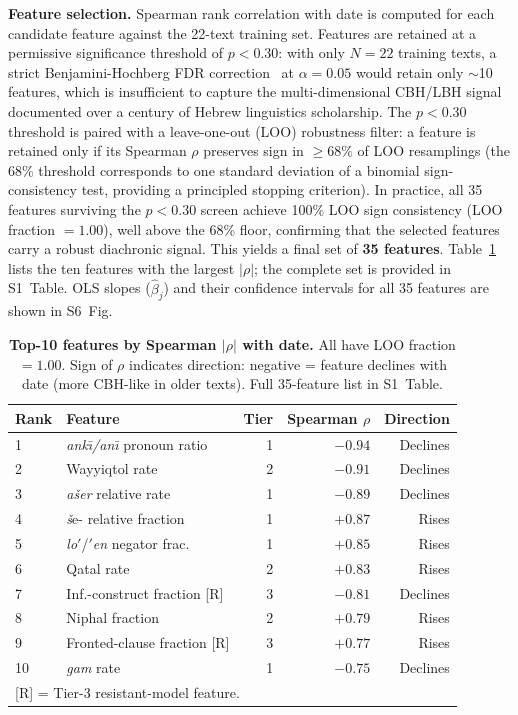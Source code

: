 \documentclass[10pt,letterpaper]{article}
\begin{document}
\textbf{Feature selection.}  Spearman rank correlation with date is
computed for each candidate feature against the 22-text training set.
Features are retained at a permissive significance threshold of $p < 0.30$:
with only $N = 22$ training texts, a strict Benjamini-Hochberg FDR
correction~\cite{Benjamini1995} at $\alpha = 0.05$ would retain only $\sim$10 features, which
is insufficient to capture the multi-dimensional CBH/LBH signal documented
over a century of Hebrew linguistics scholarship.  The $p < 0.30$ threshold
is paired with a leave-one-out (LOO) robustness filter: a feature is
retained only if its Spearman $\rho$ preserves sign in $\geq 68\%$ of LOO
resamplings (the 68\% threshold corresponds to one standard deviation of a
binomial sign-consistency test, providing a principled stopping criterion).
In practice, all 35 features surviving the $p < 0.30$ screen achieve
100\% LOO sign consistency (LOO fraction $= 1.00$), well above the 68\%
floor, confirming that the selected features carry a robust diachronic
signal.  This yields a final set of \textbf{35 features}.  Table~\ref{tab:top_features}
lists the ten features with the largest $|\rho|$; the complete set is
provided in S1~Table.  OLS slopes ($\hat{\beta}_j$) and their confidence
intervals for all 35 features are shown in S6~Fig.

\begin{table}[!ht]
\centering
\caption{\textbf{Top-10 features by Spearman $|\rho|$ with date.}
All have LOO fraction $= 1.00$.  Sign of $\rho$ indicates direction:
negative = feature declines with date (more CBH-like in older texts).
Full 35-feature list in S1~Table.}
\begin{tabular}{llrrr}
\hline
\textbf{Rank} & \textbf{Feature} & \textbf{Tier} &
  \textbf{Spearman $\rho$} & \textbf{Direction} \\
\hline
1  & \textit{ank\={\i}/an\={\i}} pronoun ratio & 1 & $-0.94$ & Declines \\
2  & Wayyiqtol rate                            & 2 & $-0.91$ & Declines \\
3  & \textit{ašer} relative rate               & 1 & $-0.89$ & Declines \\
4  & \textit{š}e- relative fraction            & 1 & $+0.87$ & Rises    \\
5  & \textit{lo$'$}/\textit{$'$en} negator frac.& 1 & $+0.85$ & Rises    \\
6  & Qatal rate                                & 2 & $+0.83$ & Rises    \\
7  & Inf.-construct fraction [R]               & 3 & $-0.81$ & Declines \\
8  & Niphal fraction                           & 2 & $+0.79$ & Rises    \\
9  & Fronted-clause fraction [R]               & 3 & $+0.77$ & Rises    \\
10 & \textit{gam} rate                         & 1 & $-0.75$ & Declines \\
\hline
\multicolumn{5}{l}{\small{[R] = Tier-3 resistant-model feature.}} \\
\end{tabular}
\label{tab:top_features}
\end{table}
\end{document}
